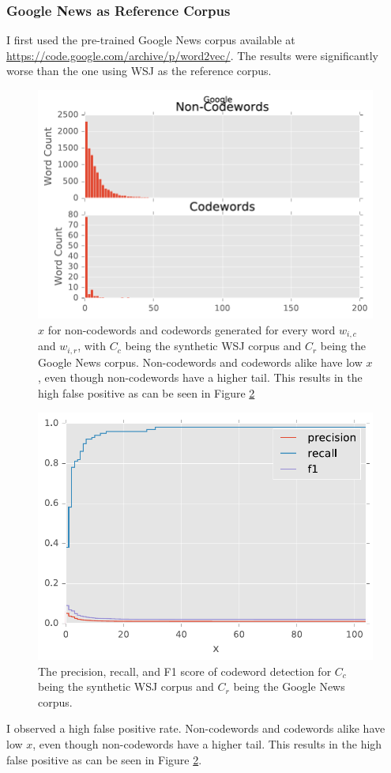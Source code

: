 \subsubsection{Google News as Reference Corpus}

I first used the pre-trained Google News corpus available at \url{https://code.google.com/archive/p/word2vec/}. The results were significantly worse than the one using WSJ as the reference corpus.

\begin{figure}[h]
\centering
\includegraphics[width=.5\textwidth]{figures/google-count.pdf}
\caption{$x$ for non-codewords and codewords generated for every word $w_{i, c}$ and $w_{i, r}$, with $C_c$ being the synthetic WSJ corpus and $C_r$ being the Google News corpus. Non-codewords and codewords alike have low $x$, even though non-codewords have a higher tail. This results in the high false positive as can be seen in Figure \ref{fig-google-f1}}
\label{fig-google-count}
\end{figure}

\begin{figure}[h]
\centering
\includegraphics[width=.5\textwidth]{figures/google-f1.pdf}
\caption{The precision, recall, and F1 score of codeword detection for $C_c$ being the synthetic WSJ corpus and $C_r$ being the Google News corpus.}
\label{fig-google-f1}
\end{figure}

I observed a high false positive rate. Non-codewords and codewords alike have low $x$, even though non-codewords have a higher tail. This results in the high false positive as can be seen in Figure \ref{fig-google-f1}.

